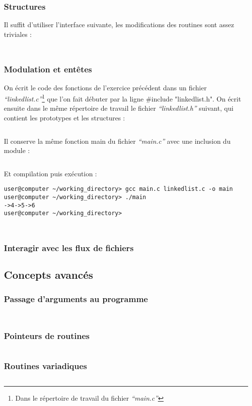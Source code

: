 \documentclass[../main.tex]{subfiles}
\begin{document}
\subsubsection{Structures}
 \newline
Il suffit d'utiliser l'interface suivante, les modifications des routines sont assez triviales :
\inputminted{c}{solutions/matrix.h}
\inputminted{c}{solutions/linkedlist_1.c}
\subsubsection{Modulation et entêtes}
 \newline
On écrit le code des fonctions de l'exercice précédent dans un fichier \textit{``linkedlist.c''}\footnote{Dans le répertoire de travail du fichier \textit{``main.c''}} que l'on fait débuter par la ligne \textsf{\#include "linkedlist.h"}. On écrit ensuite dans le même répertoire de travail le fichier \textit{``linkedlist.h''} suivant, qui contient les prototypes et les structures :
\inputminted{c}{solutions/linkedlist_2.h}
Il conserve la même fonction \textsf{main} du fichier \textit{``main.c''} avec une inclusion du module :
\inputminted{c}{solutions/linkedlist_2.c}
Et compilation puis exécution :
\begin{verbatim}
user@computer ~/working_directory> gcc main.c linkedlist.c -o main
user@computer ~/working_directory> ./main
->4->5->6
user@computer ~/working_directory>
\end{verbatim}
\inputminted{c}{solutions/calculatrice.c}
\inputminted{c}{solutions/atoi.c}
\subsubsection{Interagir avec les flux de fichiers}
\subsection{Concepts avancés}
\subsubsection{Passage d'arguments au programme}
\inputminted{c}{solutions/list_args.c}
\inputminted{c}{solutions/cat.c}
\subsubsection{Pointeurs de routines}
\inputminted{c}{solutions/mapping.c}
\subsubsection{Routines variadiques}
\inputminted{c}{solutions/un_doigt_du_zero.c}
\end{document}

